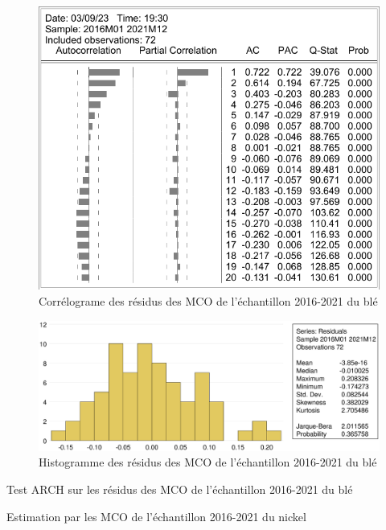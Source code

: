 \documentclass[12pt,a4paper]{article}
\begin{document}
\begin{figure}[H]
    \centering
    \includegraphics[]{annexe/3_2_mco_corr_ble.pdf}
    \caption{Corrélograme des résidus des MCO de l'échantillon 2016-2021 du blé}
    \label{fig:mco_cor_ble21}
\end{figure}

\begin{figure}[H]
    \centering
    \includegraphics[width=\textwidth]{annexe/3_2_mco_hist_ble.eps}
    \caption{Histogramme des résidus des MCO de l'échantillon 2016-2021 du blé}
    \label{fig:mco_hist_ble21}
\end{figure}

\begin{table}[H]
    \centering
    \caption{Test ARCH sur les résidus des MCO de l'échantillon 2016-2021 du blé}
    \label{tab:mco_homo_ble19}
    \sffamily
    
\end{table}

\begin{table}[H]
    \centering
    \caption{Estimation par les MCO de l'échantillon 2016-2021 du nickel}
    \label{tab:mco_nickel21}
    \sffamily
    
\end{table}
\end{document}
